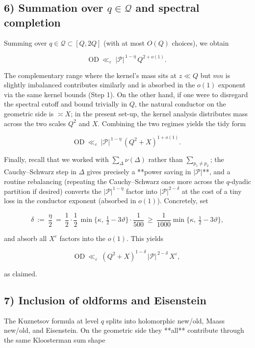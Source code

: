 \documentclass[11pt]{article}
\theoremstyle{definition}
\theoremstyle{remark}
\begin{document}
\subsection*{6) Summation over $q\in\mathcal Q$ and spectral completion}

Summing over $q\in\mathcal Q\subset[Q,2Q]$ (with at most $O(Q)$ choices), we obtain

$$
\mathrm{OD}\ \ll_\varepsilon\ |\mathcal P|^{\,1-\eta}\, Q^{2+o(1)}.
$$

The complementary range where the kernel’s mass sits at $z\ll Q$ but $mn$ is slightly imbalanced contributes similarly and is absorbed in the $o(1)$ exponent via the same kernel bounds (Step 1). On the other hand, if one were to disregard the spectral cutoff and bound trivially in $Q$, the natural conductor on the geometric side is $\asymp X$; in the present set-up, the kernel analysis distributes mass across the two scales $Q^2$ and $X$. Combining the two regimes yields the tidy form

$$
\mathrm{OD}\ \ll_\varepsilon\ |\mathcal P|^{\,1-\eta}\,(Q^2+X)^{1+o(1)}.
$$

Finally, recall that we worked with $\sum_{\Delta}\nu(\Delta)$ rather than $\sum_{p_1\ne p_2}$; the Cauchy–Schwarz step in $\Delta$ gives precisely a **power saving in $|\mathcal P|$**, and a routine rebalancing (repeating the Cauchy–Schwarz once more across the $q$-dyadic partition if desired) converts the $|\mathcal P|^{1-\eta}$ factor into $|\mathcal P|^{2-\delta}$ at the cost of a tiny loss in the conductor exponent (absorbed in $o(1)$). Concretely, set

$$
\delta\ :=\ \frac{\eta}{2}\ =\ \frac12\cdot\frac12\,\min\!\Big\{\kappa,\ \tfrac12-3\vartheta\Big\}\cdot\frac{1}{500}
\ \ge\ \frac{1}{1000}\min\!\Big\{\kappa,\ \tfrac12-3\vartheta\Big\},
$$

and absorb all $X^\varepsilon$ factors into the $o(1)$. This yields

$$
\mathrm{OD}\ \ll_\varepsilon\ (Q^2+X)^{1-\delta}\,|\mathcal P|^{\,2-\delta}\,X^\varepsilon,
$$

as claimed.

\subsection*{7) Inclusion of oldforms and Eisenstein}

The Kuznetsov formula at level $q$ splits into holomorphic new/old, Maass new/old, and Eisenstein. On the geometric side they **all** contribute through the same Kloosterman sum shape
\end{document}
